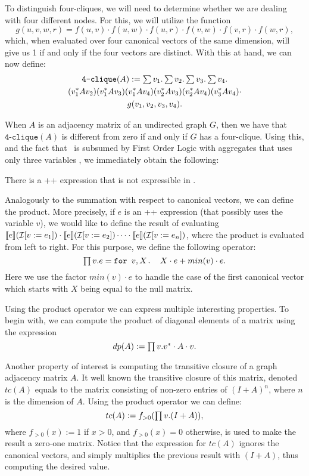 To distinguish four-cliques, we will need to determine whether we are dealing with four different nodes. For this, we will utilize the function $$g(u,v,w,r)=f(u,v)\cdot f(u,w)\cdot f(u,r)\cdot f(v,w)\cdot f(v,r)\cdot f(w,r),$$
which, when evaluated over four canonical vectors of the same dimension, will give us 1 if and only if the four vectors are distinct. With this at hand, we can now define:		
\begin{multline*}
\texttt{4-clique}(A) := \textstyle\sum v_1.\textstyle\sum v_2. \textstyle\sum v_3. \textstyle\sum v_4.\\ (v_1^*Av_2)(v_1^*Av_3)(v_1^*Av_4)(v_2^*Av_3)(v_2^*Av_4)(v_3^*Av_4) \cdot
\\g(v_1,v_2,v_3,v_4).
\end{multline*}

When $A$ is an adjacency matrix of an undirected graph $G$, then we have that $\texttt{4-clique}(A)$ is different from zero if and only if $G$ has a four-clique. Using this, and the fact that \lang\ is subsumed by First Order Logic with aggregates that uses only three variables \cite{matlang}, we immediately obtain the following:

\begin{corollary}
There is a  \lang++ expression that is not expressible in \lang.
\end{corollary}

\medskip

 Analogously to the summation with respect to canonical vectors, we can define the product. More precisely, 
if $e$ is an \lang++ expression (that possibly uses the variable $v$), we would like to define the result of evaluating $\llbracket e \rrbracket(\mathcal{I}[v := e_1]) \cdot \llbracket e \rrbracket(\mathcal{I}[v := e_2])\cdots \cdot \llbracket e \rrbracket(\mathcal{I}[v := e_n])$, where the product is evaluated from left to right. For this purpose, we define the following operator:
$$\textstyle\prod v. e=\texttt{for }v,X \texttt{. }X\cdot e + min(v)\cdot e.$$
Here we use the factor $min(v)\cdot e$ to handle the case of the first canonical vector which starts with $X$ being equal to the null matrix. 

Using the product operator we can express multiple interesting properties. To begin with, we can compute the product of diagonal elements of a matrix using the expression $$dp(A) := \textstyle\prod v. v^*\cdot A \cdot v.$$

Another property of interest is computing the transitive closure of a graph adjacency matrix $A$. It well known the transitive closure of this matrix, denoted $tc(A)$ equals to the matrix consisting of non-zero entries of $(I + A)^n$, where $n$ is the dimension of $A$. Using the product operator we can define:
$$tc(A) := f_{>0}(\textstyle\prod v. (I + A)),$$
where $f_{>0}(x) := 1$ if $x>0$, and $f_{>0}(x) = 0$ otherwise, is used to make the result a zero-one matrix. Notice that the expression for $tc(A)$ ignores the canonical vectors, and simply multiplies the previous result with $(I + A)$, thus computing the desired value.

